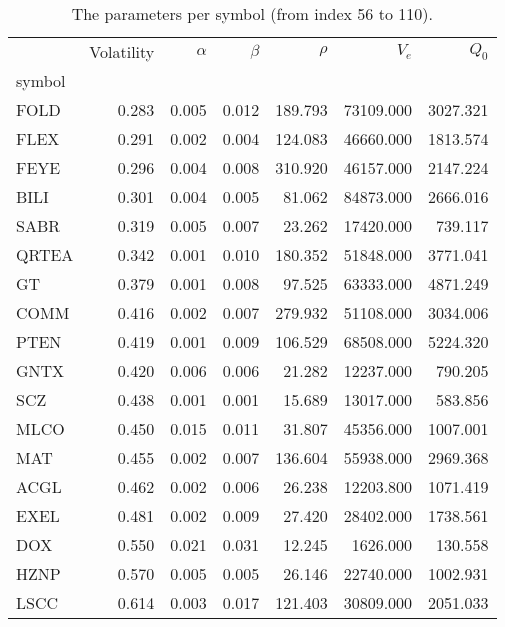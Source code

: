 \begin{table}
\centering
\caption{The parameters per symbol (from index 56 to 110).}
\label{tbl:params_1}
\begin{tabular}{lrrrrrr}
\toprule
{} &  Volatility &  $\alpha$ &  $\beta$ &  $\rho$ &    $V_e$  &   $Q_0$  \\
symbol &             &           &          &         &           &          \\
\midrule
FOLD   &       0.283 &     0.005 &    0.012 & 189.793 & 73109.000 & 3027.321 \\
FLEX   &       0.291 &     0.002 &    0.004 & 124.083 & 46660.000 & 1813.574 \\
FEYE   &       0.296 &     0.004 &    0.008 & 310.920 & 46157.000 & 2147.224 \\
BILI   &       0.301 &     0.004 &    0.005 &  81.062 & 84873.000 & 2666.016 \\
SABR   &       0.319 &     0.005 &    0.007 &  23.262 & 17420.000 &  739.117 \\
QRTEA  &       0.342 &     0.001 &    0.010 & 180.352 & 51848.000 & 3771.041 \\
GT     &       0.379 &     0.001 &    0.008 &  97.525 & 63333.000 & 4871.249 \\
COMM   &       0.416 &     0.002 &    0.007 & 279.932 & 51108.000 & 3034.006 \\
PTEN   &       0.419 &     0.001 &    0.009 & 106.529 & 68508.000 & 5224.320 \\
GNTX   &       0.420 &     0.006 &    0.006 &  21.282 & 12237.000 &  790.205 \\
SCZ    &       0.438 &     0.001 &    0.001 &  15.689 & 13017.000 &  583.856 \\
MLCO   &       0.450 &     0.015 &    0.011 &  31.807 & 45356.000 & 1007.001 \\
MAT    &       0.455 &     0.002 &    0.007 & 136.604 & 55938.000 & 2969.368 \\
ACGL   &       0.462 &     0.002 &    0.006 &  26.238 & 12203.800 & 1071.419 \\
EXEL   &       0.481 &     0.002 &    0.009 &  27.420 & 28402.000 & 1738.561 \\
DOX    &       0.550 &     0.021 &    0.031 &  12.245 &  1626.000 &  130.558 \\
HZNP   &       0.570 &     0.005 &    0.005 &  26.146 & 22740.000 & 1002.931 \\
LSCC   &       0.614 &     0.003 &    0.017 & 121.403 & 30809.000 & 2051.033 \\

\end{tabular}
\end{table}
